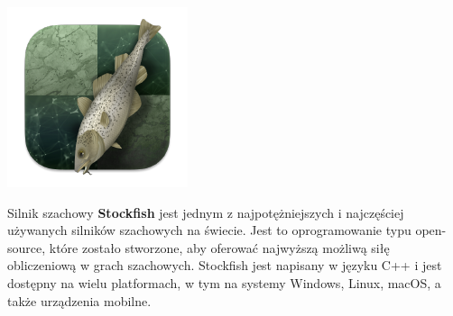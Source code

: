 \documentclass[12pt,a4paper]{article}
\begin{document}
\begin{minipage}[t]{0.2\textwidth} 
    \vspace{0pt} 
    \centering
    \includegraphics[width=\linewidth]{images/stockfish_logo.png} 
\end{minipage} 
\hfill 
\begin{minipage}[t]{0.7\textwidth} 
    \vspace{0pt} 
    \raggedright 
    Silnik szachowy \textbf{Stockfish} jest jednym z najpotężniejszych i najczęściej używanych silników szachowych na świecie. Jest to oprogramowanie typu open-source, które zostało stworzone, aby oferować najwyższą możliwą siłę obliczeniową w grach szachowych. Stockfish jest napisany w języku C++ i jest dostępny na wielu platformach, w tym na systemy Windows, Linux, macOS, a także urządzenia mobilne.
\end{minipage} 
\vspace{1cm}
\end{document}
